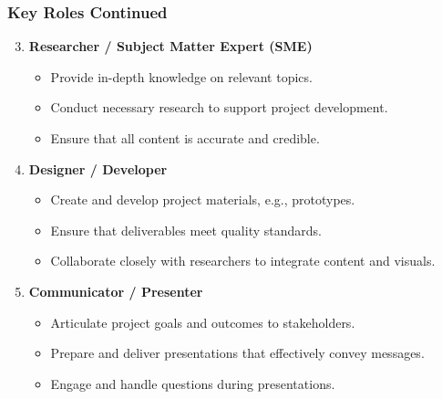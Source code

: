 \documentclass[aspectratio=169]{beamer}
\begin{document}
\begin{frame}[fragile]
    \frametitle{Key Roles Continued}
    \begin{enumerate}
        \setcounter{enumi}{2} %
        \item \textbf{Researcher / Subject Matter Expert (SME)}
        \begin{itemize}
            \item Provide in-depth knowledge on relevant topics.
            \item Conduct necessary research to support project development.
            \item Ensure that all content is accurate and credible.
        \end{itemize}
        \item \textbf{Designer / Developer}
        \begin{itemize}
            \item Create and develop project materials, e.g., prototypes.
            \item Ensure that deliverables meet quality standards.
            \item Collaborate closely with researchers to integrate content and visuals.
        \end{itemize}
        \item \textbf{Communicator / Presenter}
        \begin{itemize}
            \item Articulate project goals and outcomes to stakeholders.
            \item Prepare and deliver presentations that effectively convey messages.
            \item Engage and handle questions during presentations.
        \end{itemize}
    \end{enumerate}
\end{frame}
\end{document}
